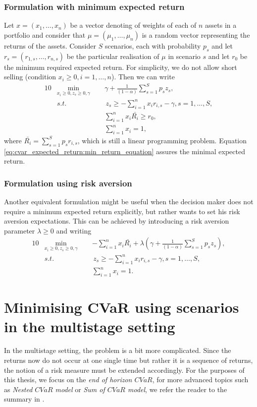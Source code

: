 \subsubsection*{Formulation with minimum expected return}
Let $x=(x_1,\dots,x_n)$ be a vector denoting of weights of each of $n$ assets in a portfolio and consider that $\mu=(\mu_1,\dots,\mu_n)$ is a random vector representing the returns of the assets. Consider $S$ scenarios, each with probability $p_s$ and let $r_s = (r_{1,s},\dots,r_{n,s})$ be the particular realisation of $\mu$ in scenario $s$ and let $r_0$ be the minimum required expected return. For simplicity, we do not allow short selling (condition $x_i \geq 0, i=1,\dots,n$). Then we can write
\begin{alignat}{10}
& \underset{x_i \geq 0 , z_s \geq 0, \gamma}{\min}  \, \, \, && \gamma + \frac{1}{(1-\alpha)} \sum_{s=1}^S p_s z_s, \label{cvar_expected_return}  \\
&s.t. && \, z_s \geq  -\sum_{i=1}^{n} x_i r_{i,s} -\gamma, s=1,\dots,S, \nonumber \\
&  && \sum_{i=1}^{n} x_i \bar{R_i} \geq r_0, \label{eq:cvar_expected_return:min_return_equation} \\
&  && \sum_{i=1}^{n} x_i = 1, \nonumber
\end{alignat}
where $\bar{R_i}=\sum_{s=1}^{S}p_s r_{i,s}$, which is still a linear programming problem. Equation \ref{eq:cvar_expected_return:min_return_equation} assures the minimal expected return.
\subsubsection*{Formulation using risk aversion}
Another equivalent formulation might be useful when the decision maker does not require a minimum expected return explicitly, but rather wants to set his risk aversion expectations. This can be achieved by introducing a risk aversion parameter $\lambda \geq 0$ and writing
\begin{alignat}{10}
& \underset{x_i \geq 0 , z_s \geq 0, \gamma}{\min}  \, \, \, && - \sum_{i=1}^{n} x_i \bar{R_i} + \lambda \left( \gamma + \frac{1}{(1-\alpha)} \sum_{s=1}^S p_s z_s \right), \label{eq:cvar_risk_aversion} \\
&s.t. && \, z_s \geq  -\sum_{i=1}^{n} x_i r_{i,s} -\gamma, s=1,\dots,S, \nonumber \\
&  && \sum_{i=1}^{n} x_i = 1. \nonumber
\end{alignat}
\section{Minimising CVaR using scenarios in the multistage setting}
In the multistage setting, the problem is a bit more complicated. Since the returns now do not occur at one single time but rather it is a sequence of returns, the notion of a risk measure must be extended accordingly. For the purposes of this thesis, we focus on the \textit{end of horizon $CVaR$}, for more advanced topics such as \textit{Nested $CVaR$ model} or \textit{Sum of $CVaR$ model}, we refer the reader to the summary in \cite[Section 1.4.]{kozmikv_phdthesis}.

